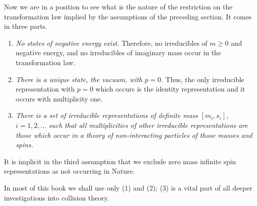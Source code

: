 Now we are in a position to see what is the nature of the restriction on the
transformation law implied by the assumptions of the preceding section. It
comes in three parts.

\begin{enumerate}
  \item \emph{No states of negative energy exist.} Therefore, no irreducibles of
  $m\geq0$ and negative energy, and no irreducibles of imaginary mass occur in
  the transformation law.

  \item \emph{There is a unique state, the vacuum, with $p=0$.} Thus, the only
  irreducible representation with $p=0$ which occurs is the identity
  representation and it occurs with multiplicity one.

  \item \emph{There is a set of irreducible representations of definite mass
  $[m_i,s_i]$, $i=1,2,\ldots$ such that all multiplicities of other irreducible
  representations are}
  \emph{those which occur in a theory of non-interacting particles of those
  masses and spins.}
\end{enumerate}

It is implicit in the third assumption that we exclude zero mass infinite spin
representations as not occurring in Nature.

In most of this book we shall use only (1) and (2); (3) is a vital part of all
deeper investigations into collision theory.
